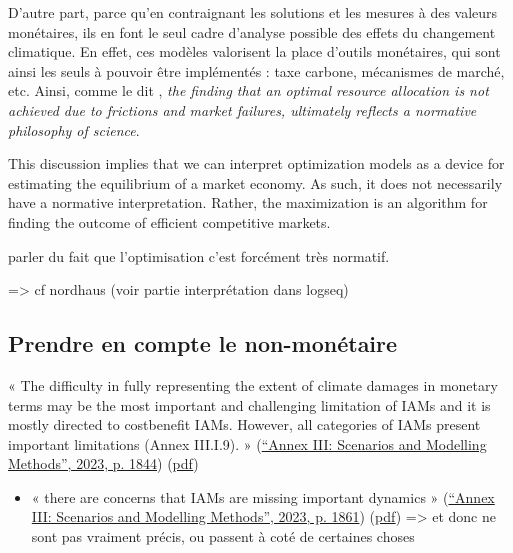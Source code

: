 D'autre part, parce qu'en contraignant les solutions et les mesures à des valeurs monétaires, ils en font le seul cadre d'analyse possible des effets du changement climatique. En effet, ces modèles valorisent la place d'outils monétaires, qui sont ainsi les seuls à pouvoir être implémentés : taxe carbone, mécanismes de marché, etc. Ainsi, comme le dit \cite{mercure_modelling_2019}, \emph{the finding that an optimal resource allocation is not achieved due to frictions and market failures, ultimately reflects a normative philosophy of science}. 

\begin{displayquote}
    This discussion implies that we can interpret optimization models as a device for estimating the equilibrium of a market economy. As such, it does not necessarily have a normative interpretation. Rather, the maximization is an algorithm for finding the outcome of efficient competitive markets.
\end{displayquote}

\begin{tcolorbox}
    parler du fait que l'optimisation c'est forcément très normatif. 

    => cf nordhaus (voir partie interprétation dans logseq)
\end{tcolorbox}


\subsection{Prendre en compte le non-monétaire}


« The difficulty in fully representing the extent of climate damages in monetary terms may be the most important and challenging limitation of IAMs and it is mostly directed to costbenefit IAMs. However, all categories of IAMs present important limitations (Annex III.I.9). » (\href{zotero://select/library/items/2SDDNUUF}{“Annex III: Scenarios and Modelling Methods”, 2023, p. 1844}) (\href{zotero://open-pdf/library/items/CHVFSLLH?page=4&annotation=YT933ZM4}{pdf})
 

\begin{itemize}
    \item « there are concerns that IAMs are missing important dynamics » (\href{zotero://select/library/items/2SDDNUUF}{“Annex III: Scenarios and Modelling Methods”, 2023, p. 1861}) (\href{zotero://open-pdf/library/items/CHVFSLLH?page=21&annotation=WDMBNU3A}{pdf})
=> et donc ne sont pas vraiment précis, ou passent à coté de certaines choses

\end{itemize}

